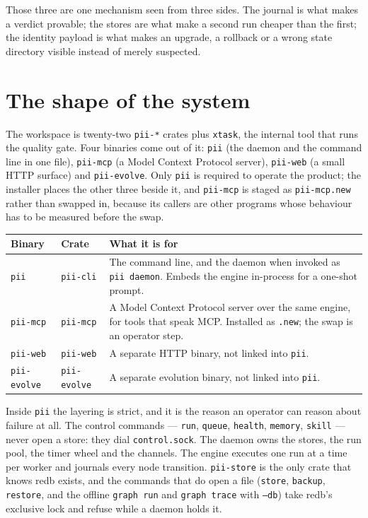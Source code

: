Those three are one mechanism seen from three sides. The journal is what makes a verdict
provable; the stores are what make a second run cheaper than the first; the identity
payload is what makes an upgrade, a rollback or a wrong state directory visible instead of
merely suspected.

\section{The shape of the system}

The workspace is twenty-two \texttt{pii-*} crates plus \texttt{xtask}, the internal
tool that runs the quality gate. Four binaries come out of it: \texttt{pii} (the daemon
and the command line in one file), \texttt{pii-mcp} (a Model Context Protocol server),
\texttt{pii-web} (a small HTTP surface) and \texttt{pii-evolve}. Only \texttt{pii} is
required to operate the product; the installer places the other three beside it, and
\texttt{pii-mcp} is staged as \texttt{pii-mcp.new} rather than swapped in, because its
callers are other programs whose behaviour has to be measured before the swap.

\begin{longtable}{@{}p{}p{}p{}@{}}
	\toprule
	\textbf{Binary} & \textbf{Crate} & \textbf{What it is for} \\
	\midrule
	\endhead
	\texttt{pii} & \texttt{pii-cli} & The command line, and the daemon when invoked as
	\texttt{pii daemon}. Embeds the engine in-process for a one-shot prompt. \\
	\texttt{pii-mcp} & \texttt{pii-mcp} & A Model Context Protocol server over the same
	engine, for tools that speak MCP. Installed as \texttt{.new}; the swap is an operator
	step. \\
	\texttt{pii-web} & \texttt{pii-web} & A separate HTTP binary, not linked into
	\texttt{pii}. \\
	\texttt{pii-evolve} & \texttt{pii-evolve} & A separate evolution binary, not linked
	into \texttt{pii}. \\
	\bottomrule
\end{longtable}

Inside \texttt{pii} the layering is strict, and it is the reason an operator can reason
about failure at all. The control commands --- \texttt{run}, \texttt{queue},
\texttt{health}, \texttt{memory}, \texttt{skill} --- never open a store: they dial
\texttt{control.sock}. The daemon owns the stores, the run pool, the timer wheel and the
channels. The engine executes one run at a time per worker and journals every node
transition. \texttt{pii-store} is the only crate that knows redb exists, and the commands
that do open a file (\texttt{store}, \texttt{backup}, \texttt{restore}, and the offline
\texttt{graph run} and \texttt{graph trace} with \texttt{--db}) take redb's exclusive lock
and refuse while a daemon holds it.

